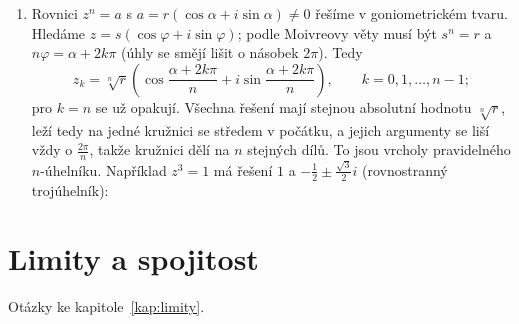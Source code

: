 \begin{enumerate}[label=\textbf{\arabic*.}, leftmargin=*, itemsep=0.8em]
  \item {}
  Rovnici $z^n = a$ s $a = r(\cos\alpha + i\sin\alpha)\neq 0$ řešíme v goniometrickém tvaru. Hledáme $z = s(\cos\varphi + i\sin\varphi)$; podle Moivreovy věty musí být $s^n = r$ a $n\varphi = \alpha + 2k\pi$ (úhly se smějí lišit o násobek $2\pi$). Tedy
  \begin{equation*}
    z_k = \sqrt[n]{r}\left(\cos\frac{\alpha + 2k\pi}{n} + i\sin\frac{\alpha + 2k\pi}{n}\right), \qquad k = 0, 1, \ldots, n - 1;
  \end{equation*}
  pro $k = n$ se už opakují. Všechna řešení mají stejnou absolutní hodnotu $\sqrt[n]{r}$, leží tedy na jedné kružnici se středem v počátku, a jejich argumenty se liší vždy o $\frac{2\pi}{n}$, takže kružnici dělí na $n$ stejných dílů. To jsou vrcholy pravidelného $n$-úhelníku. Například $z^3 = 1$ má řešení $1$ a $-\frac{1}{2}\pm\frac{\sqrt{3}}{2}i$ (rovnostranný trojúhelník):
  \begin{center}
  \end{center}
\end{enumerate}

\section{Limity a spojitost}

Otázky ke kapitole~\ref{kap:limity}.

